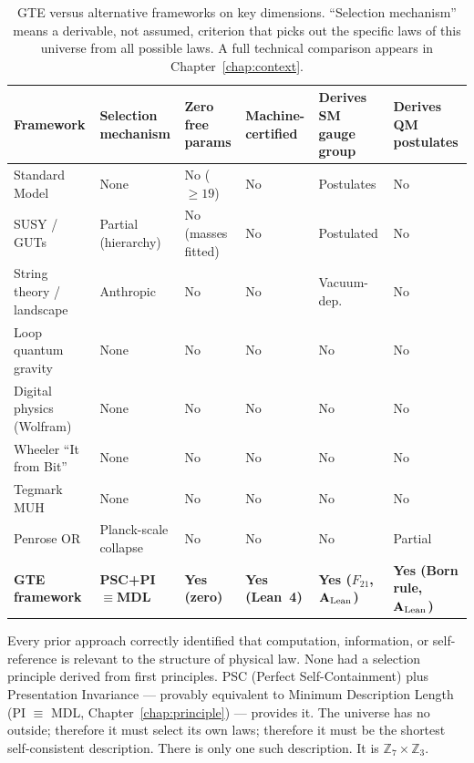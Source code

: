 \documentclass[11pt,openany]{book}
\theoremstyle{remark}
\newcommand{\CatAL}{\ensuremath{\textbf{A}_{\rm Lean}}}
\begin{document}
\begin{table}[htbp]
\centering
\caption{GTE versus alternative frameworks on key dimensions.
``Selection mechanism'' means a derivable, not assumed, criterion that picks out the
specific laws of this universe from all possible laws.
A full technical comparison appears in Chapter~\ref{chap:context}.}
\label{tab:framework_comparison}
\small
\begin{tabularx}{\textwidth}{@{}P{3.0cm}P{2.4cm}P{1.8cm}P{2.0cm}P{2.0cm}P{2.8cm}@{}}
\toprule
\textbf{Framework} & \textbf{Selection mechanism} & \textbf{Zero free params} & \textbf{Machine-certified} & \textbf{Derives SM gauge group} & \textbf{Derives QM postulates} \\
\midrule
Standard Model & None & No ($\geq 19$) & No & Postulates & No \\
SUSY / GUTs & Partial (hierarchy) & No (masses fitted) & No & Postulated & No \\
String theory / landscape & Anthropic & No & No & Vacuum-dep. & No \\
Loop quantum gravity & None & No & No & No & No \\
Digital physics (Wolfram) & None & No & No & No & No \\
Wheeler ``It from Bit'' & None & No & No & No & No \\
Tegmark MUH & None & No & No & No & No \\
Penrose OR & Planck-scale collapse & No & No & No & Partial \\
\textbf{GTE framework} & \textbf{PSC+PI$\equiv$MDL} & \textbf{Yes (zero)} & \textbf{Yes (Lean~4)} & \textbf{Yes ($F_{21}$, \CatAL)} & \textbf{Yes (Born rule, \CatAL)} \\
\bottomrule
\end{tabularx}
\end{table}

\FloatBarrier

Every prior approach correctly identified that computation, information, or
self-reference is relevant to the structure of physical law.
None had a selection principle derived from first principles.
PSC (Perfect Self-Containment) plus Presentation Invariance --- provably equivalent to
Minimum Description Length (PI $\equiv$ MDL, Chapter~\ref{chap:principle}) ---
provides it.
The universe has no outside; therefore it must select its own laws; therefore it must
be the shortest self-consistent description.
There is only one such description.
It is $\mathbb{Z}_7\times\mathbb{Z}_3$.

\end{document}
